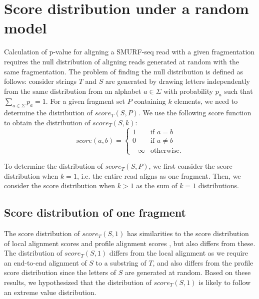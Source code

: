 \section{Score distribution under a random model}
Calculation of p-value for aligning a SMURF-seq read with a given
fragmentation requires the null distribution of aligning reads
generated at random with the same fragmentation. The
problem of finding the null distribution is defined as follows:
consider strings $T$ and $S$ are generated by drawing letters independently
from the same distribution from an alphabet $a \in \Sigma$ with
probability $p_a$ such that $\sum_{a \in \Sigma} p_a = 1$.  For a given
fragment set $P$ containing $k$ elements, we need to determine the
distribution of $score_T(S, P)$.
We use the following score function to obtain the distribution of
$score_T(S,k)$:
\begin{equation*}
\label{exact_score}
score(a,b)=\begin{cases} 1 & \text{if } a = b \\
            0 & \text{if } a\neq b \\
            -\infty & \text{otherwise.}
\end{cases}
\end{equation*}

To determine the distribution of $score_T(S, P)$, we first consider the score
distribution when $k = 1$, i.e. the entire read aligns as one fragment.
Then, we consider the score distribution when $k > 1$ as the sum of $k =
1$ distributions.

\subsection{Score distribution of one fragment}
The score distribution of $score_T(S,1)$ has similarities to the score
distribution of local alignment scores
\citep{smith1983statistical,altschul199627} and profile alignment scores
\citep{goldstein1994approximations}, but also differs from these.  The
distribution of $score_T(S,1)$ differs from the local alignment as we
require an end-to-end alignment of $S$ to a substring of $T$, and also
differs from the profile score distribution since the letters of $S$ are
generated at random.
Based on these results, we hypothesized that the distribution of
$score_T(S,1)$ is likely to follow an extreme value distribution.


